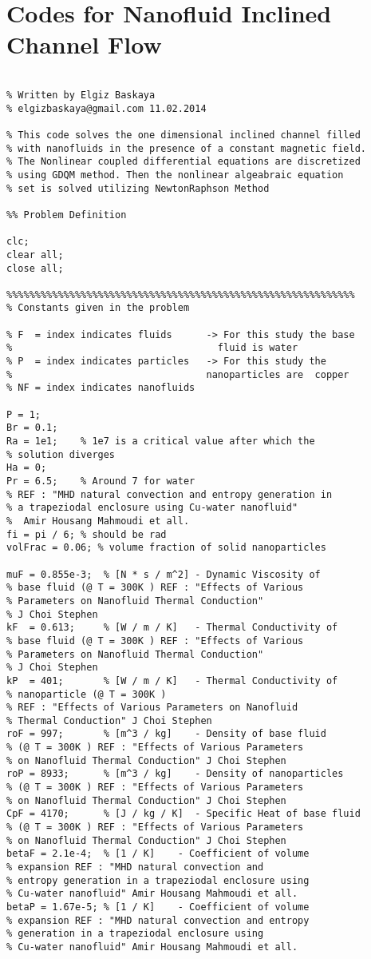 \section{Codes for Nanofluid Inclined Channel Flow}

\begin{lstlisting}

% Written by Elgiz Baskaya
% elgizbaskaya@gmail.com 11.02.2014

% This code solves the one dimensional inclined channel filled
% with nanofluids in the presence of a constant magnetic field. 
% The Nonlinear coupled differential equations are discretized 
% using GDQM method. Then the nonlinear algeabraic equation
% set is solved utilizing NewtonRaphson Method

%% Problem Definition

clc;
clear all;
close all;

%%%%%%%%%%%%%%%%%%%%%%%%%%%%%%%%%%%%%%%%%%%%%%%%%%%%%%%%%%%%%
% Constants given in the problem

% F  = index indicates fluids      -> For this study the base 
%                                    fluid is water
% P  = index indicates particles   -> For this study the 
%                                  nanoparticles are  copper
% NF = index indicates nanofluids

P = 1;
Br = 0.1;
Ra = 1e1;    % 1e7 is a critical value after which the 
% solution diverges 
Ha = 0;
Pr = 6.5;    % Around 7 for water 
% REF : "MHD natural convection and entropy generation in 
% a trapeziodal enclosure using Cu-water nanofluid"
%  Amir Housang Mahmoudi et all. 
fi = pi / 6; % should be rad
volFrac = 0.06; % volume fraction of solid nanoparticles

muF = 0.855e-3;  % [N * s / m^2] - Dynamic Viscosity of 
% base fluid (@ T = 300K ) REF : "Effects of Various 
% Parameters on Nanofluid Thermal Conduction" 
% J Choi Stephen
kF  = 0.613;     % [W / m / K]   - Thermal Conductivity of 
% base fluid (@ T = 300K ) REF : "Effects of Various 
% Parameters on Nanofluid Thermal Conduction" 
% J Choi Stephen
kP  = 401;       % [W / m / K]   - Thermal Conductivity of 
% nanoparticle (@ T = 300K ) 
% REF : "Effects of Various Parameters on Nanofluid 
% Thermal Conduction" J Choi Stephen
roF = 997;       % [m^3 / kg]    - Density of base fluid 
% (@ T = 300K ) REF : "Effects of Various Parameters 
% on Nanofluid Thermal Conduction" J Choi Stephen
roP = 8933;      % [m^3 / kg]    - Density of nanoparticles 
% (@ T = 300K ) REF : "Effects of Various Parameters 
% on Nanofluid Thermal Conduction" J Choi Stephen
CpF = 4170;      % [J / kg / K]  - Specific Heat of base fluid 
% (@ T = 300K ) REF : "Effects of Various Parameters 
% on Nanofluid Thermal Conduction" J Choi Stephen
betaF = 2.1e-4;  % [1 / K]    - Coefficient of volume 
% expansion REF : "MHD natural convection and 
% entropy generation in a trapeziodal enclosure using 
% Cu-water nanofluid" Amir Housang Mahmoudi et all. 
betaP = 1.67e-5; % [1 / K]    - Coefficient of volume                    
% expansion REF : "MHD natural convection and entropy 
% generation in a trapeziodal enclosure using 
% Cu-water nanofluid" Amir Housang Mahmoudi et all. 
 

\end{lstlisting}

